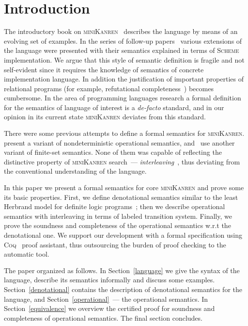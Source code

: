 \section{Introduction}

The introductory book on \textsc{miniKanren}~\cite{TRS} describes the language by means of an evolving set of examples. In the
series of follow-up papers~\cite{MicroKanren,CKanren,CKanren1,AlphaKanren,2016,Guided} various extensions of the language were presented with
their semantics explained in terms of \textsc{Scheme} implementation. We argue that this style of semantic definition is
fragile and not self-evident since it requires the knowledge of semantics of concrete implementation language. In addition the justification of
important properties of relational programs (for example, refutational completeness~\cite{WillThesis}) becomes cumbersome. In the
area of programming languages research a formal definition for the semantics of language of interest is a \emph{de-facto} standard, and
in our opinion in its current state \textsc{miniKanren} deviates from this standard.

There were some previous attempts to define a formal semantics for \textsc{miniKanren}. \citet{RelConversion} present a variant of nondeterministic
operational semantics, and~\citet{DivTest} use another variant of finite-set semantics. None of them was capable of reflecting
the distinctive property of \textsc{miniKanren} search~--- \emph{interleaving}~\cite{Search}, thus deviating from the conventional understanding
of the language.

In this paper we present a formal semantics for core \textsc{miniKanren} and prove some its basic properties. First,
we define denotational semantics similar to the least Herbrand model for definite logic programs~\cite{LHM}; then
we describe operational semantics with interleaving in terms of labeled transition system. Finally, we prove the soundness and
completeness of the operational semantics w.r.t the denotational one. We support our development with a formal specification
using \textsc{Coq}~\cite{Coq} proof assistant, thus outsourcing the burden of proof checking to the automatic tool. 

The paper organized as follows. In Section~\ref{language} we give the syntax of the language, describe its semantics
informally and discuss some examples. Section~\ref{denotational} contains the description of denotational semantics for
the language, and Section~\ref{operational}~--- the operational semantics. In Section~\ref{equivalence} we overview the
certified proof for soundness and completeness of operational semantics. The final section concludes.
